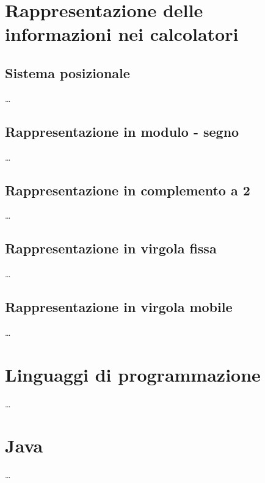 \documentclass{article}
\begin{document}
\section{Rappresentazione delle informazioni nei calcolatori}
\subsection{Sistema posizionale}

\dots

\subsection{Rappresentazione in modulo - segno}

\dots

\subsection{Rappresentazione in complemento a 2}
\dots


\subsection{Rappresentazione in virgola fissa}
\dots

\subsection{Rappresentazione in virgola mobile}
\dots

\section{Linguaggi di programmazione}
\dots


\section{Java}
\dots
\end{document}
